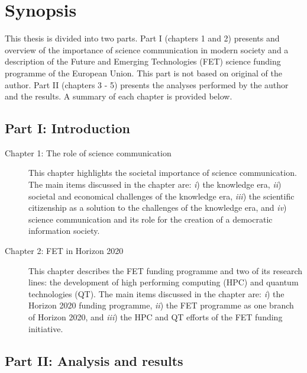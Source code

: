 \chapter*{Synopsis}
This thesis is divided into two parts. Part I (chapters 1 and 2) presents and overview of the importance of science communication in modern society and a description of the Future and Emerging Technologies (FET) science funding programme of the European Union. This part is not based on original of the author. Part II (chapters 3 - 5) presents the analyses performed by the author and the results. A summary of each chapter is provided below.

\section*{Part I: Introduction}

\begin{description}
 \item [Chapter 1: The role of science communication] This chapter highlights the societal importance of science communication. The main items discussed in the chapter are: \emph{i}) the knowledge era, \emph{ii}) societal and economical challenges of the knowledge era, \emph{iii}) the scientific citizenship as a solution to the challenges of the knowledge era, and \emph{iv}) science communication and its role for the creation of a democratic information society.

 \item [Chapter 2: FET in Horizon 2020] This chapter describes the FET funding programme and two of its research lines: the development of high performing computing (HPC) and quantum technologies (QT). The main items discussed in the chapter are: \emph{i}) the Horizon 2020 funding programme, \emph{ii}) the FET programme as one branch of Horizon 2020, and \emph{iii}) the HPC and QT efforts of the FET funding initiative.
\end{description}

\section*{Part II: Analysis and results}

